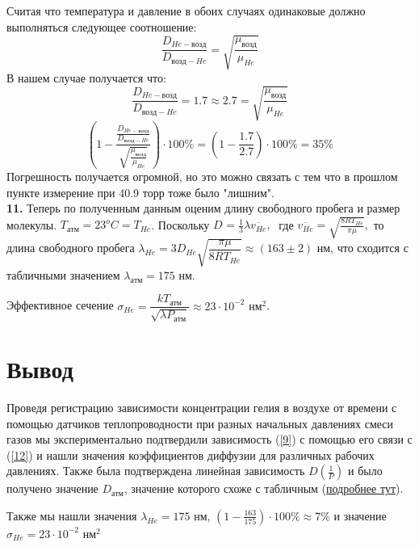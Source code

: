 \documentclass[12 pt, a4paper]{article}%
\begin{document}
Считая что температура и давление в обоих случаях одинаковые должно выполняться следующее соотношение: 
\begin{equation}\label{15}
    \frac{D_{He-возд}}{D_{возд-He}} = \sqrt{\frac{\mu_{возд}}{\mu_{He}}}
\end{equation}
В нашем случае получается что: 
\begin{equation*}
    \frac{D_{He-возд}}{D_{возд-He}} = 1.7 \approx 2.7 = \sqrt{\frac{\mu_{возд}}{\mu_{He}}}
\end{equation*}
\begin{equation*}
    \left( 1 - \frac{\frac{D_{He-возд}}{D_{возд-He}}}{\sqrt{\frac{\mu_{возд}}{\mu_{He}}}}\right) \cdot 100\% = \left( 1 - \frac{1.7}{2.7}\right) \cdot 100\% = 35\%
\end{equation*}
Погрешность получается огромной, но это можно связать с тем что в прошлом пункте измерение при 40.9 торр тоже было "лишним". \\
\textbf{11.} Теперь по полученным данным оценим длину свободного пробега и размер молекулы. $T_{атм} = 23^oC = T_{He}$. Поскольку 
$D_{} = \frac{1}{3} \lambda \overline{v_{He}},\;$ где $\overline{v_{He}} = \sqrt{\frac{8RT_{He}}{\pi \mu}},$
то длина свободного пробега $\lambda_{He} = 3D_{He}\sqrt{\dfrac{\pi \mu}{8RT_{He}}} \approx (163\pm2)$ нм, что сходится с табличными значением $\lambda_{атм} = 175$ нм.


Эффективное сечение  $\sigma_{He} = \dfrac{kT_{атм}}{\sqrt{\lambda P_{атм}}} \approx 23 \cdot 10^{-2} $ $нм^2$.

\section*{Вывод}
Проведя регистрацию зависимости концентрации гелия в воздухе от времени с помощью датчиков теплопроводности при разных начальных давлениях смеси газов мы экспериментально подтвердили зависимость (\ref{9}) с помощью его связи с (\ref{12}) и нашли значения коэффициентов диффузии для различных рабочих давлениях. Также была подтверждена линейная зависимость $D(\frac{1}{P})$ и было получено значение $D_{атм}$, значение которого схоже с табличным (\hyperref[D_atm]{подробнее тут}).

Также мы нашли значения $\lambda_{He} = 175$ нм, $\left( 1 - \frac{163}{175}\right) \cdot 100\% \approx 7\%$  и значение $\sigma_{He} = 23 \cdot 10^{-2} $ $нм^2$
\end{document}

